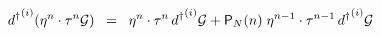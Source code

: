 \begin{equation}
{d^{\dagger}}^{(i)} ( \eta^n \cdot \tau^n {\cal{G}} ) \;\; = \;\; \eta^n \cdot \tau^n \, {d^{\dagger}}^{(i)} {\cal{G}} + {\textsf{P}}_N (n) \; \eta^{n-1} \cdot \tau^{n-1} \, {d^{\dagger}}^{(i)} {\cal{G}}
\label{eq:x11}
\end{equation}

